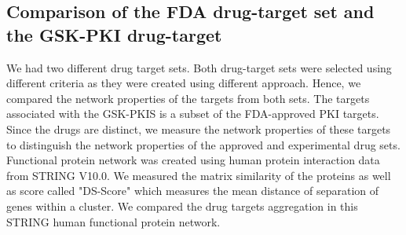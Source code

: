 \documentclass[a4paper, 11pt]{article}
\begin{document}
\subsection*{Comparison of the FDA drug-target set and the GSK-PKI drug-target}
We had two different drug target sets. Both drug-target sets were selected using different criteria as they were created using different approach. Hence, we compared the network properties of the targets from both sets. The targets associated with the GSK-PKIS is a subset of the FDA-approved PKI targets. Since the drugs are distinct, we measure the network properties of these targets to distinguish the network properties of the approved and experimental drug sets. Functional protein network was created using human protein interaction data from STRING V10.0. We measured the matrix similarity of the proteins as well as \cite{menche2015uncovering} score called "DS-Score" which measures the mean distance of separation of genes within a cluster. We compared the drug targets aggregation in this STRING human functional protein network.
\end{document}
